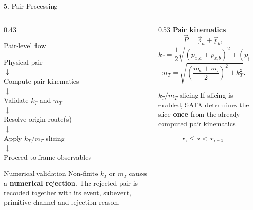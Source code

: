 \documentclass{beamer}
\begin{document}
\begin{frame}{5. Pair Processing}
\fontsize{7.2}{8.0}\selectfont

\begin{columns}[T]

\begin{column}{0.43\textwidth}
\begin{block}{Pair-level flow}
\begin{center}
Physical pair\\[-0.15em]
$\downarrow$\\[-0.15em]
Compute pair kinematics\\[-0.15em]
$\downarrow$\\[-0.15em]
Validate $k_T$ and $m_T$\\[-0.15em]
$\downarrow$\\[-0.15em]
Resolve origin route(s)\\[-0.15em]
$\downarrow$\\[-0.15em]
Apply $k_T/m_T$ slicing\\[-0.15em]
$\downarrow$\\[-0.15em]
Proceed to frame observables
\end{center}
\end{block}

\vspace{-0.25em}
\begin{alertblock}{Numerical validation}
Non-finite $k_T$ or $m_T$ causes a \textbf{numerical rejection}. The rejected pair is recorded together with its event, subevent, primitive channel and rejection reason.
\end{alertblock}
\end{column}

\begin{column}{0.53\textwidth}
\textbf{Pair kinematics}
\vspace{-0.35em}
\[
\vec{P}=\vec{p}_a+\vec{p}_b,
\]
\vspace{-0.7em}
\[
k_T=\frac{1}{2}
\sqrt{(p_{x,a}+p_{x,b})^2+(p_{y,a}+p_{y,b})^2},
\]
\vspace{-0.7em}
\[
m_T=\sqrt{\left(\frac{m_a+m_b}{2}\right)^2+k_T^2}.
\]
\vspace{-0.3em}

\begin{block}{$k_T/m_T$ slicing}
If slicing is enabled, SAFA determines the slice \textbf{once} from the already-computed pair kinematics.

\vspace{-0.25em}
\[
x_i \le x < x_{i+1}.
\]
\vspace{-0.45em}


\end{block}
\end{column}
\end{columns}
\end{frame}
\end{document}
